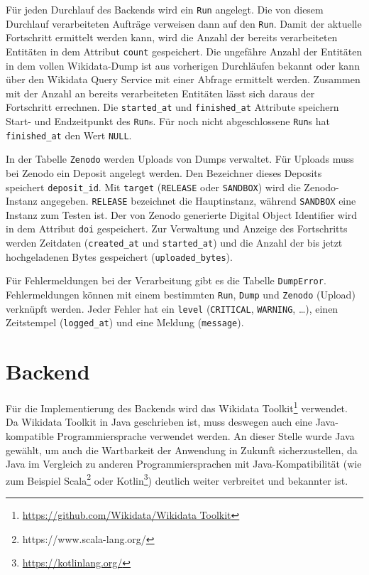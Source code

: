 Für jeden Durchlauf des Backends wird ein \verb|Run| angelegt.
Die von diesem Durchlauf verarbeiteten Aufträge verweisen dann auf den \verb|Run|.
Damit der aktuelle Fortschritt ermittelt werden kann, wird die Anzahl der bereits verarbeiteten Entitäten in dem Attribut \verb|count| gespeichert.
Die ungefähre Anzahl der Entitäten in dem vollen Wikidata-Dump ist aus vorherigen Durchläufen bekannt oder kann über den Wikidata Query Service mit einer Abfrage ermittelt werden.
Zusammen mit der Anzahl an bereits verarbeiteten Entitäten lässt sich daraus der Fortschritt errechnen.
Die \verb|started_at| und \verb|finished_at| Attribute speichern Start- und Endzeitpunkt des \verb|Run|s.
Für noch nicht abgeschlossene \verb|Run|s hat \verb|finished_at| den Wert \verb|NULL|.

In der Tabelle \verb|Zenodo| werden Uploads von Dumps verwaltet.
Für Uploads muss bei Zenodo ein Deposit angelegt werden.
Den Bezeichner dieses Deposits speichert \verb|deposit_id|.
Mit \verb|target| (\verb|RELEASE| oder \verb|SANDBOX|) wird die Zenodo-Instanz angegeben.
\verb|RELEASE| bezeichnet die Hauptinstanz, während \verb|SANDBOX| eine Instanz zum Testen ist.
Der von Zenodo generierte Digital Object Identifier wird in dem Attribut \verb|doi| gespeichert.
Zur Verwaltung und Anzeige des Fortschritts werden Zeitdaten (\verb|created_at| und \verb|started_at|) und die Anzahl der bis jetzt hochgeladenen Bytes gespeichert (\verb|uploaded_bytes|). 

Für Fehlermeldungen bei der Verarbeitung gibt es die Tabelle \verb|DumpError|. 
Fehlermeldungen können mit einem bestimmten \verb|Run|, \verb|Dump| und \verb|Zenodo| (Upload) verknüpft werden.
Jeder Fehler hat ein \verb|level| (\verb|CRITICAL|, \verb|WARNING|, \ldots), einen Zeitstempel (\verb|logged_at|) und eine Meldung (\verb|message|).

\section{Backend}
Für die Implementierung des Backends wird das Wikidata Toolkit\footnote{\url{https://github.com/Wikidata/Wikidata Toolkit}} verwendet.
Da Wikidata Toolkit in Java geschrieben ist, muss deswegen auch eine Java-kompatible Programmiersprache verwendet werden.
An dieser Stelle wurde Java gewählt, um auch die Wartbarkeit der Anwendung in Zukunft sicherzustellen, da Java im Vergleich zu anderen Programmiersprachen mit Java-Kompatibilität (wie zum Beispiel Scala\footnote{https://www.scala-lang.org/} oder Kotlin\footnote{\url{https://kotlinlang.org/}}) deutlich weiter verbreitet und bekannter ist.

